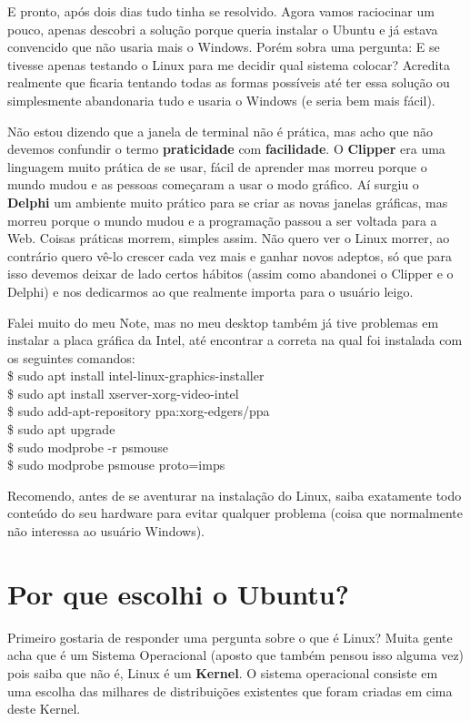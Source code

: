 E pronto, após dois dias tudo tinha se resolvido. Agora vamos raciocinar um pouco, apenas descobri a solução porque queria instalar o Ubuntu e já estava convencido que não usaria mais o Windows. Porém sobra uma pergunta: E se tivesse apenas testando o Linux para me decidir qual sistema colocar? Acredita realmente que ficaria tentando todas as formas possíveis até ter essa solução ou simplesmente abandonaria tudo e usaria o Windows (e seria bem mais fácil). 

Não estou dizendo que a janela de terminal não é prática, mas acho que não devemos confundir o termo \textbf{praticidade} com \textbf{facilidade}. O \textbf{Clipper} era uma linguagem muito prática de se usar, fácil de aprender mas morreu porque o mundo mudou e as pessoas começaram a usar o modo gráfico. Aí surgiu o \textbf{Delphi} um ambiente muito prático para se criar as novas janelas gráficas, mas morreu porque o mundo mudou e a programação passou a ser voltada para a Web. Coisas práticas morrem, simples assim. Não quero ver o Linux morrer, ao contrário quero vê-lo crescer cada vez mais e ganhar novos adeptos, só que para isso devemos deixar de lado certos hábitos (assim como abandonei o Clipper e o Delphi) e nos dedicarmos ao que realmente importa para o usuário leigo.

Falei muito do meu Note, mas no meu desktop também já tive problemas em instalar a placa gráfica da Intel, até encontrar a correta na qual foi instalada com os seguintes comandos: \\
{\ttfamily\$ sudo apt install intel-linux-graphics-installer \\
\$ sudo apt install xserver-xorg-video-intel \\
\$ sudo add-apt-repository ppa:xorg-edgers/ppa \\
\$ sudo apt upgrade \\
\$ sudo modprobe -r psmouse \\
\$ sudo modprobe psmouse proto=imps}

Recomendo, antes de se aventurar na instalação do Linux, saiba exatamente todo conteúdo do seu hardware para evitar qualquer problema (coisa que normalmente não interessa ao usuário Windows).

\section{Por que escolhi o Ubuntu?}
Primeiro gostaria de responder uma pergunta sobre o que é Linux? Muita gente acha que é um Sistema Operacional (aposto que também pensou isso alguma vez) pois saiba que não é, Linux é um \textbf{Kernel}. O sistema operacional consiste em uma escolha das milhares de distribuições existentes que foram criadas em cima deste Kernel.


